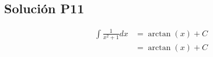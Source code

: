 \begin{CajaTitulo}{\begin{center}\subsection{Solución P11}\end{center}}
    \vspace{0.5cm}
    \begin{align*}
            \int \frac{1}{x^2 + 1}dx &= \arctan(x) + C \\
            &= \arctan(x) + C
    \end{align*}
\end{CajaTitulo}
